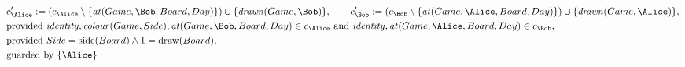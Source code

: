 \begin{align*}
&
c'_
{
\Alice
}
 := 
(c_
{
\Alice
}
 \setminus 
\{
\mathit{\detokenize{
at
}}
(
Game
,
\Bob
,
Board
,
Day
)
\}
) \cup 
\{
\mathit{\detokenize{
drawn
}}
(
Game
,
\Bob
)
\}
, \qquad 
c'_
{
\Bob
}
 := 
(c_
{
\Bob
}
 \setminus 
\{
\mathit{\detokenize{
at
}}
(
Game
,
\Alice
,
Board
,
Day
)
\}
) \cup 
\{
\mathit{\detokenize{
drawn
}}
(
Game
,
\Alice
)
\}
,\\
&
\text{provided } 
\mathit{\detokenize{
identity
}}
,
\mathit{\detokenize{
colour
}}
(
Game
,
Side
)
,
\mathit{\detokenize{
at
}}
(
Game
,
\Bob
,
Board
,
Day
)
 \in c_
{
\Alice
}
 \text{ and } 
\mathit{\detokenize{
identity
}}
,
\mathit{\detokenize{
at
}}
(
Game
,
\Alice
,
Board
,
Day
)
 \in c_
{
\Bob
}
,\\
&
\text{provided } 
Side
=
\mathrm{
side
}(
Board
)
\land
1
=
\mathrm{
draw
}(
Board
)
,\\
&
\text{guarded by } \{
\Alice
\}
\end{align*}

